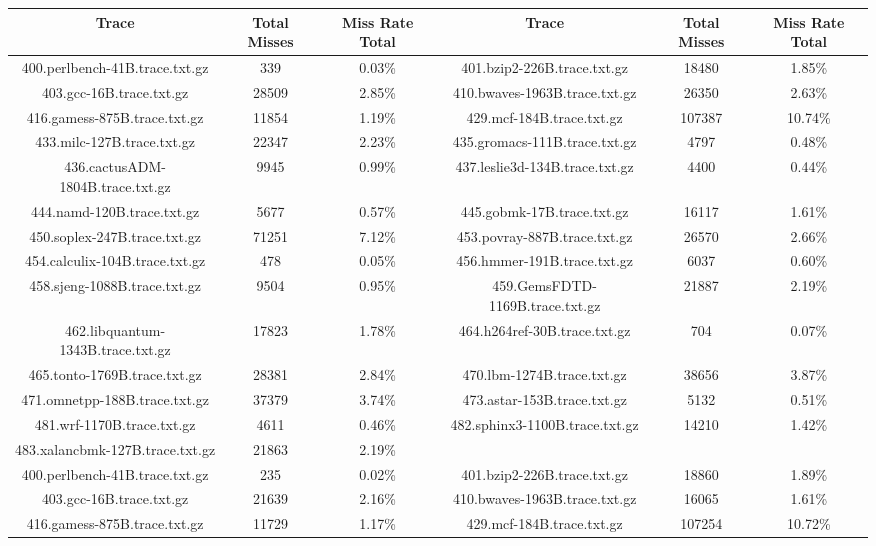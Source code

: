 \begin{table}[H]
\centering
\begin{tabular}{|c|c|c|c|c|c|}
\hline
Trace & Total Misses & Miss Rate Total & Trace & Total Misses & Miss Rate Total \\
\hline
400.perlbench-41B.trace.txt.gz & 339 & 0.03\% & 401.bzip2-226B.trace.txt.gz & 18480 & 1.85\% \\\hline
403.gcc-16B.trace.txt.gz & 28509 & 2.85\% & 410.bwaves-1963B.trace.txt.gz & 26350 & 2.63\% \\\hline
416.gamess-875B.trace.txt.gz & 11854 & 1.19\% & 429.mcf-184B.trace.txt.gz & 107387 & 10.74\% \\\hline
433.milc-127B.trace.txt.gz & 22347 & 2.23\% & 435.gromacs-111B.trace.txt.gz & 4797 & 0.48\% \\\hline
436.cactusADM-1804B.trace.txt.gz & 9945 & 0.99\% & 437.leslie3d-134B.trace.txt.gz & 4400 & 0.44\% \\\hline
444.namd-120B.trace.txt.gz & 5677 & 0.57\% & 445.gobmk-17B.trace.txt.gz & 16117 & 1.61\% \\\hline
450.soplex-247B.trace.txt.gz & 71251 & 7.12\% & 453.povray-887B.trace.txt.gz & 26570 & 2.66\% \\\hline
454.calculix-104B.trace.txt.gz & 478 & 0.05\% & 456.hmmer-191B.trace.txt.gz & 6037 & 0.60\% \\\hline
458.sjeng-1088B.trace.txt.gz & 9504 & 0.95\% & 459.GemsFDTD-1169B.trace.txt.gz & 21887 & 2.19\% \\\hline
462.libquantum-1343B.trace.txt.gz & 17823 & 1.78\% & 464.h264ref-30B.trace.txt.gz & 704 & 0.07\% \\\hline
465.tonto-1769B.trace.txt.gz & 28381 & 2.84\% & 470.lbm-1274B.trace.txt.gz & 38656 & 3.87\% \\\hline
471.omnetpp-188B.trace.txt.gz & 37379 & 3.74\% & 473.astar-153B.trace.txt.gz & 5132 & 0.51\% \\\hline
481.wrf-1170B.trace.txt.gz & 4611 & 0.46\% & 482.sphinx3-1100B.trace.txt.gz & 14210 & 1.42\% \\\hline
483.xalancbmk-127B.trace.txt.gz & 21863 & 2.19\% & & & &  \\\hline
400.perlbench-41B.trace.txt.gz & 235 & 0.02\% & 401.bzip2-226B.trace.txt.gz & 18860 & 1.89\% \\\hline
403.gcc-16B.trace.txt.gz & 21639 & 2.16\% & 410.bwaves-1963B.trace.txt.gz & 16065 & 1.61\% \\\hline
416.gamess-875B.trace.txt.gz & 11729 & 1.17\% & 429.mcf-184B.trace.txt.gz & 107254 & 10.72\% \\\hline

\end{tabular}
\end{table}
